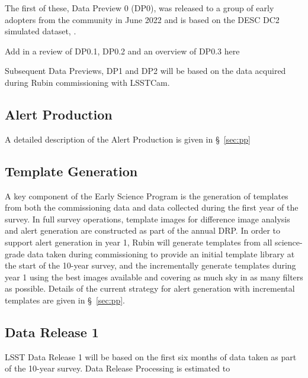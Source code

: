 The first of these, Data Preview 0 (DP0), was released to a group of early adopters from the community in June 2022 and is based on the DESC DC2 simulated dataset, \citep{2021ApJS..253...31L}. 

Add in a review of DP0.1, DP0.2 and an overview of  DP0.3  here

Subsequent Data Previews, DP1 and DP2 will be based on the data acquired during Rubin commissioning with LSSTCam. 

\subsection{Alert Production} 

A detailed description of the Alert Production is given in \S~\ref{sec:pp}

\subsection {Template Generation}

A key component of the Early Science Program is the generation of templates from both the commissioning data and data collected during the first year of the survey.
In full survey operations, template images for difference image analysis and alert generation are constructed as part of the annual DRP.
In order to support alert generation in year 1, Rubin will generate templates from all science-grade data taken during commissioning to provide an initial template library at the start of the 10-year survey, and the incrementally generate templates during year 1 using the best images available and covering as much sky in as many filters as possible.
Details of the current strategy for alert generation  with incremental templates are given in  \S~\ref{sec:pp}.

\subsection{Data Release 1}

LSST Data Release 1 will be based on the first six months of data taken as part of the 10-year survey. 
Data Release Processing is estimated to 
